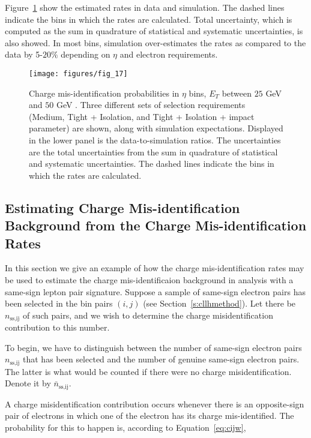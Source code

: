 Figure~\ref{f:meerates} \cite{atlaselcid} show the estimated rates in data and
simulation. The dashed lines indicate the bins in which the rates are
calculated. Total uncertainty, which is computed as the sum in quadrature of
statistical and systematic uncertainties, is also showed. In most bins,
simulation over-estimates the rates as compared to the data by 5-$20\%$
depending on $\eta$ and electron requirements.

\begin{figure}[H]
	\texttt{[image: figures/fig\_17]}
	\centering

	\caption{Charge mis-identification probabilities in $\eta$ bins, $E_T$ between
		$25$ GeV and $50$ GeV \cite{atlaselcid}. Three different sets of selection
		requirements (Medium, Tight + Isolation, and Tight + Isolation + impact
		parameter) are shown, along with simulation expectations. Displayed in the
		lower panel is the data-to-simulation ratios. The uncertainties are the total
		uncertainties from the sum in quadrature of statistical and systematic
		uncertainties. The dashed lines indicate the bins in which the rates are
		calculated.}

	\label{f:meerates}
\end{figure}


\subsection{Estimating Charge Mis-identification Background from the Charge
	Mis-identification Rates}

In this section we give an example of how the charge mis-identification rates
may be used to estimate the charge mis-identificaion background in analysis
with a same-sign lepton pair signature. Suppose a sample of same-sign electron
pairs has been selected in the bin pairs $(i,j)$ (see
Section~\ref{s:cllhmethod}). Let there be $n_{\text{ss,ij}}$ of such pairs, and
we wish to determine the charge misidentification contribution to this number.

To begin, we have to distinguish between the number of same-sign electron pairs
$n_{\text{ss,ij}}$ that has been selected and the number of genuine same-sign
electron pairs. The latter is what would be counted if there were no charge
misidentification. Denote it by $\bar{n}_{\text{ss,ij}}$.

A charge misidentification contribution occurs whenever there is an
opposite-sign pair of electrons in which one of the electron has its charge
mis-identified. The probability for this to happen is, according to
Equation~\ref{eq:cijw},

